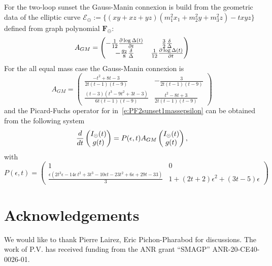 \documentclass[a4paper,12pt]{article}
\numberwithin{equation}{section}
\numberwithin{figure}{section}
\def\su{\circleddash}
\begin{document}
For the two-loop sunset the Gauss-Manin connexion is build from the
geometric data of the elliptic curve
$\mathscr{E}_\su:=\{(xy+xz+yz)(m_1^2x_1+m_2^2y+m_3^2z)-t xyz\}$
defined from graph polynomial $\textbf{F}_\su$:
\begin{equation}
  \label{eq:AGM}
  A_{GM}=
  \begin{pmatrix}
    -{1\over 12}{\partial \log\Delta(t)\over \partial t} &{3\over
      2}{\delta\over \Delta}\cr
    -{g_2\over8}{\delta\over\Delta}&{1\over12}{\partial\log\Delta(t)\over\partial t}
  \end{pmatrix}
\end{equation}
For the all equal mass case the Gauss-Manin connexion is
\begin{equation}
  \label{eq:AGM2sunset1mass}
  A_{GM}=\begin{pmatrix}
\frac{-t^{2}+8 t -3}{2 t \left(t -1\right) \left(t -9\right)} & -\frac{3}{2 t \left(t -1\right) \left(t -9\right)} 
\\
 \frac{\left(t -3\right) \left(t^{3}-9 t^{2}+3 t -3\right)}{6 t \left(t -1\right) \left(t -9\right)} & \frac{t^{2}-8 t +3}{2 t \left(t -1\right) \left(t -9\right)} 
\end{pmatrix}
\end{equation}
and the
Picard-Fuchs operator for
in~\eqref{e:PF2sunset1massepsilon} can be obtained from the following
system
\begin{equation}
  {d\over dt}
  \begin{pmatrix}
    I_\su(t)\cr g(t)
  \end{pmatrix} =P(\epsilon,t) A_{GM} \begin{pmatrix}
    I_\su(t)\cr g(t)
  \end{pmatrix},
\end{equation}
with
\begin{equation}
  P(\epsilon,t)=
  \begin{pmatrix}
    1 & 0 
\\
 \frac{\epsilon  \left(2 t^{3} \epsilon -14 \epsilon  \,t^{2}+3 t^{3}-10 \epsilon  t -23 t^{2}+6 \epsilon +29 t -33\right)}{3} & 1+\left(2 t +2\right) \epsilon^{2}+\left(3 t -5\right) \epsilon  
  \end{pmatrix}
\end{equation}

\section*{Acknowledgements}
We would like to thank Pierre Lairez, Eric Pichon-Pharabod  for discussions.
The work of P.V. has received funding from the ANR grant ``SMAGP''
ANR-20-CE40-0026-01.
\end{document}
